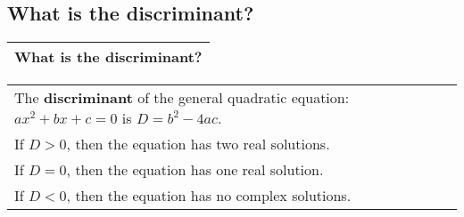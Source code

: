 \subsection{What is the discriminant?}
\begin{small}
    \begin{tabularx}{1\textwidth}{
            p{}
        }
        \toprule
            What is the discriminant?
        \\
        \bottomrule
    \end{tabularx}
\end{small}
\begin{small}
    \begin{tabularx}{1\textwidth}{
            p{}
        }
        \toprule
        The \textbf{discriminant} of the general quadratic equation: $ax^2 + bx
        + c = 0$ is $D = b^2 - 4ac$. \\
        If $D>0$, then the equation has two real solutions. \\
        If $D=0$, then the equation has one real solution. \\
        If $D<0$, then the equation has no complex solutions.
        \\
        \bottomrule

    \end{tabularx}
\end{small}
